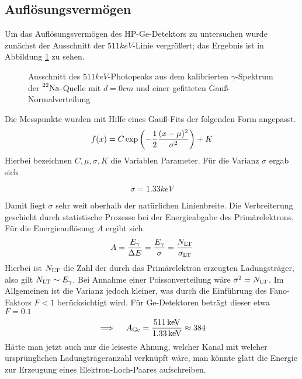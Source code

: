 
	\FloatBarrier
	\subsection{Auflösungsvermögen}
	\label{ssec:aufloesung}
	
		Um das Auflösungsvermögen des HP-Ge-Detektors zu untersuchen wurde zunächst der Ausschnitt der $511 \unit{keV} $-Linie vergrößert; das Ergebnis ist in Abbildung \ref{fig:gauss} zu sehen.

		\begin{figure}[htb]
			\centering
			
			\caption{Ausschnitt des $511\unit{keV}$-Photopeaks aus dem kalibrierten $\gamma$-Spektrum der $\prescript{22}{}{\mathrm{Na}}$-Quelle mit $d=0\unit{cm}$ und einer gefitteten Gauß-Normalverteilung}
			\label{fig:gauss}
		\end{figure}

		Die Messpunkte wurden mit Hilfe eines Gauß-Fits der folgenden Form angepasst. 
		\[ f(x) = C \exp\left( - \frac{1}{2} \frac{(x - \mu)^2}{\sigma ^2} \right) + K \]
		Hierbei bezeichnen $C,\mu,\sigma,K$ die Variablen Parameter.
		Für die Varianz $\sigma$ ergab sich
		
		\[ \sigma = 1.33 \unit{keV}\]

		Damit liegt $\sigma$ sehr weit oberhalb der natürlichen Linienbreite.
		Die Verbreiterung geschieht durch statistische Prozesse bei der Energieabgabe des Primärelektrons.
		Für die Energieauflösung $A$ ergibt sich
		\[
		 	A = \frac{E_\gamma}{\Delta E} = \frac{E_\gamma}{\sigma} = 
		 	\frac{N_{\mathrm{LT}}}{\sigma_{\mathrm{LT}}} 
		 \] 
		Hierbei ist $N_{\mathrm{LT}}$ die Zahl der durch das Primärelektron erzeugten Ladungsträger, also gilt $N_{\mathrm{LT}} \sim E_\gamma $.
		Bei Annahme einer Poissonverteilung wäre $\sigma ^2 = N_{\mathrm{LT}} $.
		Im Allgemeinen ist die Varianz jedoch kleiner, was durch die Einführung des Fano-Faktors $F < 1$ berücksichtigt wird.
		Für Ge-Detektoren beträgt dieser etwa $F = 0.1$
		\[
			\implies \quad A_{\mathrm{Ge}} = \frac{511 \, \mathrm{keV} }{1.33\, \mathrm{keV} } \approx 384
		\]
		Hätte man jetzt auch nur die leiseste Ahnung, welcher Kanal mit welcher ursprünglichen Ladungträgeranzahl verknüpft wäre, man könnte glatt die Energie zur Erzeugung eines Elektron-Loch-Paares aufschreiben.

